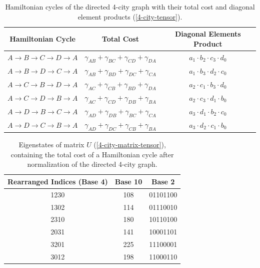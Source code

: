 \documentclass[msc,oneside]{ubcthesis}
\begin{document}
	
	\begin{table}[h]
		\centering
		\begin{tabular}{|c|c|c|}
			\hline
			\textbf{Hamiltonian Cycle} & \textbf{Total Cost} & \textbf{Diagonal Elements Product} \\
			\hline
			$A \rightarrow B \rightarrow C \rightarrow D \rightarrow A$ & $\gamma_{AB} + \gamma_{BC} + \gamma_{CD} + \gamma_{DA}$ & $a_{1} \cdot b_{2} \cdot c_{3} \cdot d_{0}$ \\
			$A \rightarrow B \rightarrow D \rightarrow C \rightarrow A$ & $\gamma_{AB} + \gamma_{BD} + \gamma_{DC} + \gamma_{CA}$ & $a_{1} \cdot b_{3} \cdot d_{2} \cdot c_{0}$ \\
			$A \rightarrow C \rightarrow B \rightarrow D \rightarrow A$ & $\gamma_{AC} + \gamma_{CB} + \gamma_{BD} + \gamma_{DA}$ & $a_{2} \cdot c_{1} \cdot b_{3} \cdot d_{0}$ \\
			$A \rightarrow C \rightarrow D \rightarrow B \rightarrow A$ & $\gamma_{AC} + \gamma_{CD} + \gamma_{DB} + \gamma_{BA}$ & $a_{2} \cdot c_{3} \cdot d_{1} \cdot b_{0}$ \\
			$A \rightarrow D \rightarrow B \rightarrow C \rightarrow A$ & $\gamma_{AD} + \gamma_{DB} + \gamma_{BC} + \gamma_{CA}$ & $a_{3} \cdot d_{1} \cdot b_{2} \cdot c_{0}$ \\
			$A \rightarrow D \rightarrow C \rightarrow B \rightarrow A$ & $\gamma_{AD} + \gamma_{DC} + \gamma_{CB} + \gamma_{BA}$ & $a_{3} \cdot d_{2} \cdot c_{1} \cdot b_{0}$ \\
			\hline
			\end{tabular}
					\caption{Hamiltonian cycles of the directed 4-city graph with their total cost and diagonal element products (\ref{4-city-tensor}).}
			\label{table:ham-cycle-details-4-city}
	\end{table}
	\begin{table}[h]
		\centering
		\begin{tabular}{|c|c|c|}	
			
			\hline
			\textbf{Rearranged Indices (Base 4)} & \textbf{Base 10} & \textbf{Base 2} \\
			\hline
			1230 & 108 & 01101100 \\
			1302 & 114 & 01110010 \\
			2310 & 180 & 10110100 \\
			2031 & 141 & 10001101 \\
			3201 & 225 & 11100001 \\
			3012 & 198 & 11000110 \\
			\hline
		\end{tabular}
		\caption{Eigenstates of matrix $U$ (\ref{4-city-matrix-tensor}), containing the total cost of a Hamiltonian cycle after normalization of the directed 4-city graph.}
		\label{table:4-city-conversions}
	\end{table}
	
\end{document}
